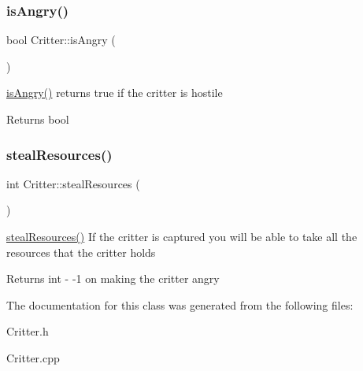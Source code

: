 \subsubsection{\texorpdfstring{is\+Angry()}{isAngry()}}
{\footnotesize\ttfamily bool Critter\+::is\+Angry (\begin{DoxyParamCaption}{ }\end{DoxyParamCaption})}

\hyperlink{classCritter_ab8433b695b842ed8c5593e2f050329de}{is\+Angry()} returns true if the critter is hostile \begin{DoxyReturn}{Returns}
bool 
\end{DoxyReturn}
\mbox{\label{classCritter_a222b3fd7953904ef94dbc0a795c3da56}} 
\subsubsection{\texorpdfstring{steal\+Resources()}{stealResources()}}
{\footnotesize\ttfamily int Critter\+::steal\+Resources (\begin{DoxyParamCaption}{ }\end{DoxyParamCaption})}

\hyperlink{classCritter_a222b3fd7953904ef94dbc0a795c3da56}{steal\+Resources()} If the critter is captured you will be able to take all the resources that the critter holds \begin{DoxyReturn}{Returns}
int -\/ \textquotesingle{}-\/1\textquotesingle{} on making the critter angry 
\end{DoxyReturn}


The documentation for this class was generated from the following files\+:\begin{DoxyCompactItemize}
\item 
Critter.\+h\item 
Critter.\+cpp\end{DoxyCompactItemize}
